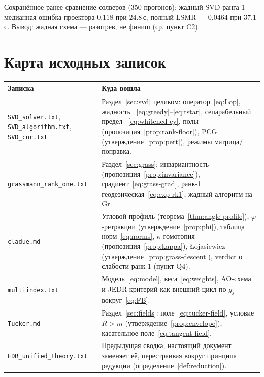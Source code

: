 \documentclass[11pt,a4paper]{article}
\newcommand{\Gr}{\mathrm{Gr}}
\theoremstyle{plain}
\theoremstyle{definition}
\theoremstyle{remark}
\begin{document}
\medskip
\noindent Сохранённое ранее сравнение солверов (350 прогонов): жадный SVD
ранга 1 --- медианная ошибка проектора $0.118$ при $24.8$\,с; полный LSMR ---
$0.0464$ при $37.1$\,с. Вывод: жадная схема --- разогрев, не финиш
(ср. пункт C2).

\appendix
\section{Карта исходных записок}\label{app:sources}

\begin{center}
\small
\begin{tabularx}{\textwidth}{@{}lX@{}}
\toprule
\textbf{Записка} & \textbf{Куда вошла}\\
\midrule
\texttt{SVD\_solver.txt}, \texttt{SVD\_algorithm.txt}, \texttt{SVD\_cur.txt}
& Раздел~\ref{sec:svd} целиком: оператор~\eqref{eq:Lop}, жадность
~\eqref{eq:greedy}--\eqref{eq:tstar}, сепарабельный предел
~\eqref{eq:whitened-ey}, полы (пропозиция~\ref{prop:rank-floor}), PCG
(утверждение~\ref{prop:pert}), режимы матрица/поправка.\\
\texttt{grassmann\_rank\_one.txt}
& Раздел~\ref{sec:grass}: инвариантность (пропозиция~\ref{prop:invariance}),
градиент~\eqref{eq:grass-grad}, ранк-1 геодезическая~\eqref{eq:exp-rk1},
жадный алгоритм на $\Gr$.\\
\texttt{cladue.md}
& Угловой профиль (теорема~\ref{thm:angle-profile}), $\varphi$-ретракции
(утверждение~\ref{prop:phi}), таблица норм~\eqref{eq:norms},
$\kappa$-гомотопия (пропозиция~\ref{prop:kappa}), Łojasiewicz
(утверждение~\ref{prop:grass-descent}), verdict о слабости ранк-1
(пункт Q4).\\
\texttt{multiindex.txt}
& Модель~\eqref{eq:model}, веса~\eqref{eq:weights}, AO-схема и JEDR-критерий
как внешний цикл по $g_j$ вокруг~\eqref{eq:FB}.\\
\texttt{Tucker.md}
& Раздел~\ref{sec:fields}: поле~\eqref{eq:tucker-field}, условие $R>m$
(утверждение~\ref{prop:envelope}), касательное поле~\eqref{eq:tangent-field}.\\
\texttt{EDR\_unified\_theory.txt} & Предыдущая сводка; настоящий документ
заменяет её, перестраивая вокруг принципа редукции
(определение~\ref{def:reduction}).\\
\bottomrule
\end{tabularx}
\end{center}
\end{document}
